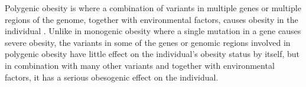 


\noindent
Polygenic obesity is where a combination of variants in multiple genes or multiple regions of the genome, together with environmental factors, causes obesity in the individual \citep{Moustafa2013}.
Unlike in monogenic obesity where a single mutation in a gene causes severe obesity, the variants in some of the genes or genomic regions involved in polygenic obesity have little effect on the individual's obesity status by itself, but in combination with many other variants and together with environmental factors, it has a serious obesogenic effect on the individual.


